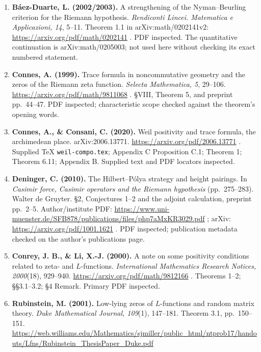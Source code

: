 \documentclass[11pt,a4paper]{article}
\theoremstyle{definition}\newtheorem{definition}[theorem]{Definition}
\theoremstyle{remark}\newtheorem{remark}[theorem]{Remark}
\begin{document}
\begin{enumerate}
  p.~1702:
  \url{https://www.numdam.org/article/AIF\_2007\_\_57\_5\_1689\_0.pdf} . In
  arXiv v4 (2005), \url{https://arxiv.org/pdf/math/0404394} , the
  corresponding statement is Theorem 2.2, p.~11. Both primary statements
  inspected; their different numbering is retained.
\item
  \textbf{Báez-Duarte, L. (2002/2003).} A strengthening of the
  Nyman--Beurling criterion for the Riemann hypothesis. \emph{Rendiconti
  Lincei. Matematica e Applicazioni, 14}, 5--11. Theorem 1.1 in
  arXiv:math/0202141v2: \url{https://arxiv.org/pdf/math/0202141} . PDF
  inspected. The quantitative continuation is arXiv:math/0205003; not
  used here without checking its exact numbered statement.
\item
  \textbf{Connes, A. (1999).} Trace formula in noncommutative geometry
  and the zeros of the Riemann zeta function. \emph{Selecta Mathematica,
  5}, 29--106. \url{https://arxiv.org/pdf/math/9811068} . §VIII, Theorem 5,
  and preprint pp.~44--47. PDF inspected; characteristic scope checked
  against the theorem's opening words.
\item
  \textbf{Connes, A., \& Consani, C. (2020).} Weil positivity and trace
  formula, the archimedean place. arXiv:2006.13771.
  \url{https://arxiv.org/pdf/2006.13771} . Supplied TeX
  \nolinkurl{weil-compo.tex}; Appendix C Proposition C.1; Theorem 1;
  Theorem 6.11; Appendix B. Supplied text and PDF locators inspected.
\item
  \textbf{Deninger, C. (2010).} The Hilbert--Pólya strategy and height
  pairings. In \emph{Casimir force, Casimir operators and the Riemann
  hypothesis} (pp.~275--283). Walter de Gruyter. §2, Conjectures 1--2
  and the adjoint calculation, preprint pp.~2--5. Author/institute PDF:
  \url{https://www.uni-muenster.de/SFB878/publications/files/php7aMxKR3029.pdf}
  ; arXiv: \url{https://arxiv.org/pdf/1001.1621} . PDF inspected; publication
  metadata checked on the author's publications page.
\item
  \textbf{Conrey, J. B., \& Li, X.-J. (2000).} A note on some positivity
  conditions related to zeta- and \(L\)-functions. \emph{International
  Mathematics Research Notices, 2000}(18), 929--940.
  \url{https://arxiv.org/pdf/math/9812166} . Theorems 1--2; §§3.1--3.2; §4
  Remark. Primary PDF inspected.
\item
  \textbf{Rubinstein, M. (2001).} Low-lying zeros of \(L\)-functions and
  random matrix theory. \emph{Duke Mathematical Journal, 109}(1),
  147--181. Theorem 3.1, pp.~150--151.
  \url{https://web.williams.edu/Mathematics/sjmiller/public\_html/ntprob17/handouts/Lfns/Rubinstein\_ThesisPaper\_Duke.pdf}

\end{enumerate}
\end{document}
